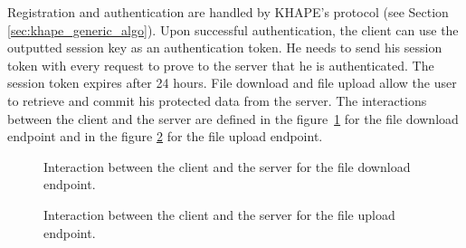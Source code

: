 \documentclass[../report.tex]{subfiles}
\begin{document}
Registration and authentication are handled by KHAPE's protocol (see Section \ref{sec:khape_generic_algo}). Upon successful authentication, the client can use the outputted session key as an authentication token. He needs to send his session token with every request to prove to the server that he is authenticated. The session token expires after 24 hours.
File download and file upload allow the user to retrieve and commit his protected data from the server. The interactions between the client and the server are defined in the figure~\ref{fig:usecase_download} for the file download endpoint and in the figure \ref{fig:usecase_upload} for the file upload endpoint.


\begin{figure}[h]
 \centering
 \setlength{\fboxsep}{10pt}
 \setlength{\fboxrule}{1pt}
 \caption{Interaction between the client and the server for the file download endpoint.}
 \label{fig:usecase_download}
\end{figure}

\begin{figure}[h]
 \centering
 \setlength{\fboxsep}{10pt}
 \setlength{\fboxrule}{1pt}
 \caption{Interaction between the client and the server for the file upload endpoint.}
 \label{fig:usecase_upload}
\end{figure}
\end{document}
